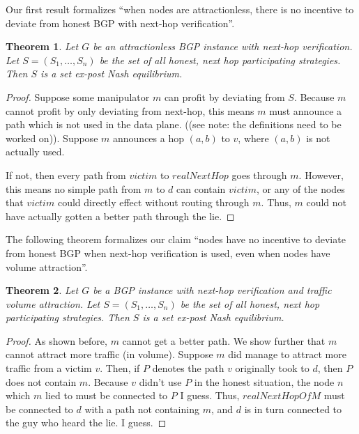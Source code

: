 \documentclass[12pt]{article}
\newtheorem{theorem}{Theorem}
\begin{document}
  Our first result formalizes ``when nodes are attractionless,
  there is no incentive to deviate from honest BGP with next-hop verification''.
  \begin{theorem}
    Let $G$ be an attractionless BGP instance with next-hop verification.
    Let $S = (S_1, \ldots, S_n)$ be the set of all honest, next hop participating
    strategies.
    Then $S$ is a set ex-post Nash equilibrium.
  \end{theorem}
  \begin{proof}
    Suppose some manipulator $m$ can profit by deviating from $S$.
    Because $m$ cannot profit by only deviating from next-hop,
    this means $m$ must announce a path which is not used in the data plane.
    ((see note: the definitions need to be worked on)).
    Suppose $m$ announces a hop $(a,b)$ to $v$, where $(a,b)$ is not actually used.

    If not, then every path from $victim$ to $realNextHop$ goes through $m$.
    However, this means no simple path from $m$ to $d$ can contain $victim$,
    or any of the nodes that $victim$ could directly effect without routing
    through $m$. Thus, $m$ could not have actually gotten a better path
    through the lie.
  \end{proof}

  The following theorem formalizes our claim ``nodes have no incentive
  to deviate from honest BGP when next-hop verification is used,
  even when nodes have volume attraction''.
  \begin{theorem}
    Let $G$ be a BGP instance with next-hop verification and traffic
    volume attraction.
    Let $S = (S_1, \ldots, S_n)$ be the set of all honest, next hop participating
    strategies. 
    Then $S$ is a set ex-post Nash equilibrium.
  \end{theorem}
  \begin{proof}
    As shown before, $m$ cannot get a better path. We show further
    that $m$ cannot attract more traffic (in volume).
    Suppose $m$ did manage to attract more traffic from a victim $v$.
    Then, if $P$ denotes the path $v$ originally took to $d$,
    then $P$ does not contain $m$. Because $v$ didn't use $P$
    in the honest situation, the node $n$ which $m$ lied to must
    be connected to $P$ I guess. Thus, $realNextHopOfM$
    must be connected to $d$ with a path not containing $m$,
    and $d$ is in turn connected to the guy who heard the lie.
    I guess.
  \end{proof}
\end{document}

